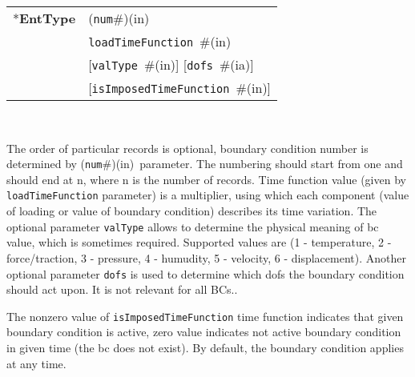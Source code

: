 \documentclass[a4paper]{article}
\newcommand{\param}[1]{\texttt{#1}} %
\newcommand{\optional}[1]{[#1]} %
\newcommand{\field}[2]{\param{#1}~\#{\tiny(#2)}} %
\newcommand{\optField}[2]{\optional{\field{#1}{#2}}}
\newcommand{\componentNum}{(\param{num}\#){\tiny(in)}} %
\newcommand{\entKeyword}[1]{*\textbf{#1}} %
\newenvironment{record}[1][]{\begin{tabular}{|ll}}{\end{tabular}\\}
\newcommand{\recentry}[2]{{#1}&{#2}\\}
\newcounter{rcc}
\newenvironment{record}[1][\textwidth]{\setcounter{rcc}{0}\rowcolors{1}{lightgray}{lightgray}\tabularx{#1}{llR} \hline}
               {\endtabularx}
\newcommand{\recentry}[2]{\ifthenelse{\value{rcc}>0}{$\backslash$ \\}{\setcounter{rcc}{1}}{#1}&{#2}&}
\begin{document}
\noindent
\begin{record}
  \recentry{\entKeyword{EntType}}{\componentNum}
  \recentry{}{\field{loadTimeFunction}{in}}
  \recentry{}{\optField{valType}{in} \optField{dofs}{ia}}
  \recentry{}{\optField{is\-Impo\-sed\-Ti\-me\-Fun\-ction}{in}}
\end{record}

The order of particular  records is optional, boundary condition number is determined by \componentNum\ parameter.
The numbering should start from one and should end at n, where n is the number of records.
Time function value (given by \param{loadTimeFunction} parameter) is a multiplier, using which
each  component (value of loading or value of boundary condition)
describes its time variation.
The optional parameter \param{valType} allows to determine the
physical meaning of bc value, which is sometimes required. Supported
values are (1 - temperature, 2 - force/traction,
3 - pressure, 4 - humudity, 5 - velocity, 6 - displacement).
Another optional parameter \param{dofs} is used to determine which dofs the boundary condition should act
upon. It is not relevant for all BCs..

The nonzero value of \param{isImposedTimeFunction} time function
indicates that given boundary condition is active, zero value
indicates not active boundary condition in given time (the bc does not
exist). By default, the boundary condition applies at any time.
\end{document}
